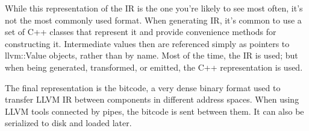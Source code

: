 \documentclass[a4paper,10pt]{article}
\begin{document}
While this representation of the IR is the one you’re likely to see most often, it’s not the most commonly used format. When generating IR, it’s common to use a set of C++ classes that represent it and provide convenience methods for constructing it. Intermediate values then are referenced simply as pointers to llvm::Value objects, rather than by name. Most of the time, the IR is used; but when being generated, transformed, or emitted, the C++ representation is used.

The final representation is the bitcode, a very dense binary format used to transfer LLVM IR between components in different address spaces. When using LLVM tools connected by pipes, the bitcode is sent between them. It can also be serialized to disk and loaded later.
\end{document}
